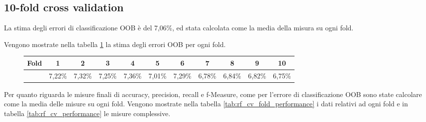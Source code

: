 \subsection{10-fold cross validation}
La stima degli errori di classificazione OOB è del 7,06\%, ed stata calcolata 
come la media della misura su ogni fold.

Vengono mostrate nella tabella \ref{tab:rf_cv_OOB} la stima degli errori OOB 
per ogni fold.

\begin{figure}[H]
	\centering
	\begin{tabular}{lcccccccccc}
		\toprule
		Fold & \textbf{1} & \textbf{2} & \textbf{3} & \textbf{4} & 
		\textbf{5} & \textbf{6} & \textbf{7} & \textbf{8} & 
		\textbf{9} & \textbf{10} \\
		\midrule
		&7,22\% & 7,32\% & 7,25\% & 7,36\% & 7,01\% & 7,29\% & 6,78\% & 6,84\% 
		& 6,82\% & 6,75\%  	\\ 
		\bottomrule
	\end{tabular}
	\label{tab:rf_cv_OOB}
\end{figure}

Per quanto riguarda le misure finali di accuracy, precision, recall e 
f-Measure, come per l'errore di classificazione OOB sono state calcolare come 
la media delle misure su ogni fold. 
Vengono mostrate nella tabella \ref{tab:rf_cv_fold_performance} i dati relativi 
ad ogni fold e in tabella \ref{tab:rf_cv_performance} le misure complessive.

